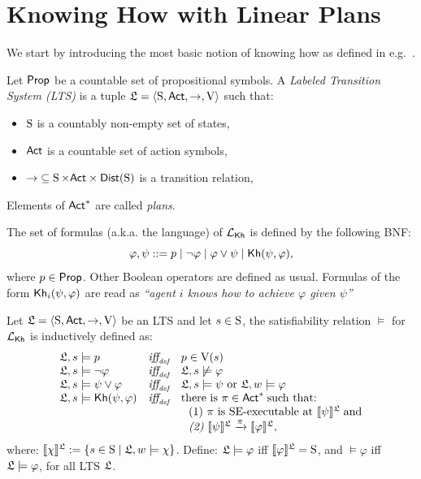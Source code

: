\section{Knowing How with Linear Plans}
\label{sec:khlinearplans}

We start by introducing the most basic notion of knowing how as defined in e.g.~\cite{Wang15lori,Wang16,Wang2016}.


\begin{definition}\label{def:lts}
    Let $\PROP$ be a countable set of propositional symbols. 
    A \emph{Labeled Transition System (LTS)}  is a tuple
    $\model=\tup{\S,\ACT,\ra,\V}$ such that:
    \begin{itemize}
        \item $\S$ is a countably non-empty set of states,
        \item $\ACT$ is a countable set of action symbols,
        \item ${\ra} \subseteq \S \times \ACT \times \dist(\S)$ is a transition relation,
    \end{itemize}
    Elements of $\ACT^*$ are called \emph{plans}.
\end{definition}

\begin{definition}
    \label{def:syntax}
    The set of formulas (a.k.a. the language) of $\Khlogic$ is defined by the following BNF:
    \[
        \varphi, \psi ::= p \mid \neg \varphi \mid \varphi \vee \psi \mid \kh(\psi,\varphi),
    \]
    where $p\in\PROP$. Other Boolean operators are defined as usual. Formulas of the form $\kh_i(\psi,\varphi)$ are read as \emph{``agent $i$ knows how to achieve $\varphi$ given $\psi$''}
\end{definition}

\begin{definition} \label{def:semantics-kh}
    Let $\model = \tup{\S,\ACT,\ra,\V}$ be an LTS and let $s\in\S$, the satisfiability relation $\models$ for $\Khlogic$ is inductively defined as:
    \[
    \begin{array}{l@{\ \ \ }c@{\ \ \  }l}
    \model, s \models p & \iffdef & p \in \V(s) \\
    \model, s\models \neg\varphi & \iffdef & \model, s \not\models \varphi \\
    \model, s \models \psi\vee\varphi & \iffdef & \model, s \models \psi \mbox{ or }\model, w \models \varphi \\
    \model, s \models \kh(\psi,\varphi) & \iffdef & \text{there is } \plan \in \ACT^* \;\text{such that:} \\
    & & \ \ \text{\rm (1)} \ \plan \text{ is SE-executable at }  \truthset{\model}{\psi}\; \text{and} \\
    & & \ \ \text{\em (2)} \ \truthset{\model}{\psi} \reach{\plan} \truthset{\model}{\varphi}, 
    \end{array}
    \]      where: $\truthset{\model}{\chi} := \csetsc{s\in\S}{\model,w\models\chi}$. Define: $\model\models\varphi$ iff  $\truthset{\model}{\varphi}=\S$, and $\models\varphi$ iff $\model\models\varphi$, for all LTS $\model$.
\end{definition}

